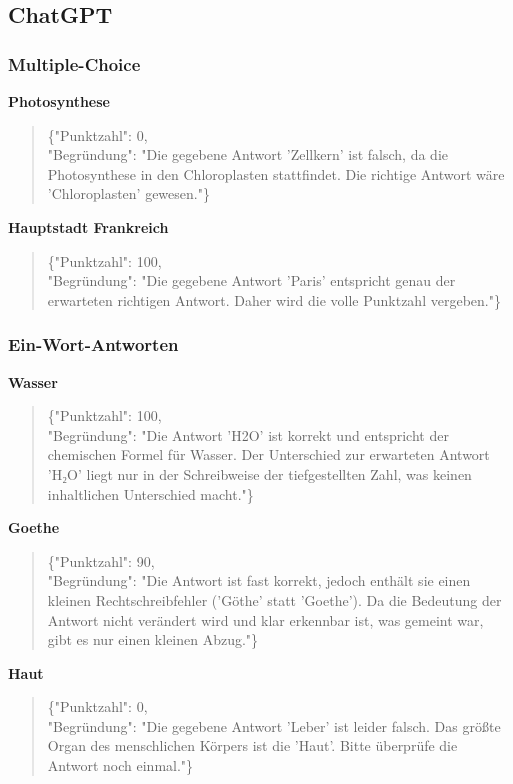 \documentclass[a4paper,12pt]{article}
\begin{document}
\subsection{ChatGPT}

\subsubsection{Multiple-Choice}

\textbf{Photosynthese}
\begin{quote}
\{"Punktzahl": 0,\\
"Begründung": "Die gegebene Antwort 'Zellkern' ist falsch, da die Photosynthese in den Chloroplasten stattfindet. Die richtige Antwort wäre 'Chloroplasten' gewesen."\}
\end{quote}

\textbf{Hauptstadt Frankreich}
\begin{quote}
\{"Punktzahl": 100,\\
"Begründung": "Die gegebene Antwort 'Paris' entspricht genau der erwarteten richtigen Antwort. Daher wird die volle Punktzahl vergeben."\}
\end{quote}

\subsubsection{Ein-Wort-Antworten}

\textbf{Wasser}
\begin{quote}
\{"Punktzahl": 100,\\
"Begründung": "Die Antwort 'H2O' ist korrekt und entspricht der chemischen Formel für Wasser. Der Unterschied zur erwarteten Antwort 'H₂O' liegt nur in der Schreibweise der tiefgestellten Zahl, was keinen inhaltlichen Unterschied macht."\}
\end{quote}

\textbf{Goethe}
\begin{quote}
\{"Punktzahl": 90,\\
"Begründung": "Die Antwort ist fast korrekt, jedoch enthält sie einen kleinen Rechtschreibfehler ('Göthe' statt 'Goethe'). Da die Bedeutung der Antwort nicht verändert wird und klar erkennbar ist, was gemeint war, gibt es nur einen kleinen Abzug."\}
\end{quote}

\textbf{Haut}
\begin{quote}
\{"Punktzahl": 0,\\
"Begründung": "Die gegebene Antwort 'Leber' ist leider falsch. Das größte Organ des menschlichen Körpers ist die 'Haut'. Bitte überprüfe die Antwort noch einmal."\}
\end{quote}
\end{document}
